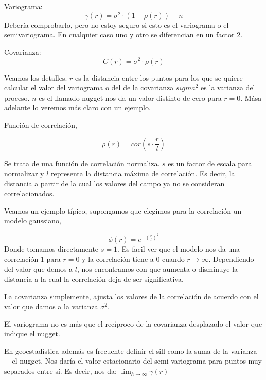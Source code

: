 \documentclass[10pt,a4paper]{report}
\begin{document}
Variograma:
\begin{equation}
	\gamma(r) = \sigma^2\cdot(1-\rho(r)) + n
\end{equation}
 Debería comprobarlo, pero no estoy seguro si esto es el variograma o el semivariograma. En cualquier caso uno y otro se diferencian en un factor 2.
 
 Covarianza:
 \begin{equation}
 	C(r) = \sigma^2\cdot \rho(r) 	
 \end{equation}
 
 Veamos los detalles. $r$ es la distancia entre los puntos para los que se quiere calcular el valor del variograma o del de la covarianza $sigma^2$ es la varianza del proceso. $n$ es el llamado nugget nos da un valor distinto de cero para $r=0$. Mása adelante lo veremos más claro con un ejemplo.
 
 Función de correlación,
 
 \begin{equation}
 	\rho(r) = cor(s\cdot\frac{r}{l})
 \end{equation} 
 
Se trata de una función de correlación normaliza. $s$ es un factor de escala para normalizar y $l$ representa la distancia máxima de correlación. Es decir, la distancia a partir de la cual los valores del campo ya no se consideran correlacionados.

Veamos un ejemplo típico, supongamos que elegimos para la correlación un modelo gaussiano,

\begin{equation}
	\phi(r) = e^{-(\frac{r}{l})^2}
\end{equation}
Donde tomamos directamente $s=1$. Es facil ver que el modelo nos da una correlación 1 para $r=0$ y la correlación tiene a 0 cuando $r\to \infty$. Dependiendo del valor que demos a $l$, nos encontramos con que aumenta o disminuye la distancia a la cual la correlación deja de ser significativa. 

La covarianza simplemente, ajusta los valores de la correlación de acuerdo con el valor que damos a la varianza $\sigma^2$.

El variograma no es más que el recíproco de la covarianza desplazado el valor que indique el nugget.

En geoestadística además es frecuente definir el sill como la suma de la varianza + el nugget. Nos daría el valor estacionario del semi-variograma para puntos muy separados entre sí. Es decir, nos da:
$\lim_{h\to\infty}\gamma(r)$ 
 	
\end{document}
